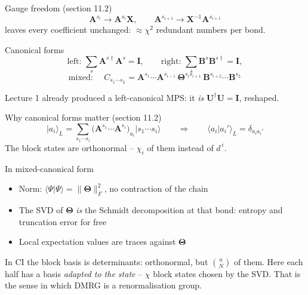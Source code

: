 \documentclass[aspectratio=169,10pt]{beamer}
\newcommand{\mbbox}[1]{%
  \begin{tcolorbox}[colback=paleblue,colframe=uioblue,title={\bfseries Many-body connection}]
  #1
  \end{tcolorbox}}
\newcommand{\ket}[1]{\vert #1\rangle}
\newcommand{\braket}[2]{\langle #1\vert #2\rangle}
\newcommand{\bmat}[1]{\bm{#1}}
\newcommand{\Amat}[1]{\bm{A}^{#1}}
\newcommand{\Bmat}[1]{\bm{B}^{#1}}
\begin{document}
\begin{frame}{Gauge freedom (section 11.2)}
  \[
    \Amat{s_i}\to\Amat{s_i}\bmat X,\qquad \Amat{s_{i+1}}\to\bmat X^{-1}\Amat{s_{i+1}}
  \]
  leaves every coefficient unchanged: $\approx\chi^2$ redundant numbers per bond.
  \begin{center}
  \end{center}
  \begin{block}{Canonical forms}
    \[
      \text{left: }\sum_s\Amat{s\dagger}\Amat s=\bmat I,
      \qquad
      \text{right: }\sum_s\Bmat{s}\Bmat{s\dagger}=\bmat I,
    \]
    \[
      \text{mixed: }\quad C_{s_1\cdots s_L}=\Amat{s_1}\cdots\Amat{s_{i-1}}\,\bm\Theta^{s_is_{i+1}}\,\Bmat{s_{i+2}}\cdots\Bmat{s_L}
    \]
  \end{block}
  \centering\small Lecture 1 already produced a left-canonical MPS: it \emph{is} $\bmat U^{\dagger}\bmat U=\bmat I$, reshaped.
\end{frame}

\begin{frame}{Why canonical forms matter (section 11.2)}
  \[
    \ket{a_i}_L=\sum_{s_1\cdots s_i}\bigl(\Amat{s_1}\cdots\Amat{s_i}\bigr)_{a_i}\ket{s_1\cdots s_i}
    \qquad\Longrightarrow\qquad
    \braket{a_i}{a_i'}_L=\delta_{a_ia_i'}
  \]
  \centering\alert{The block states are orthonormal} -- $\chi_i$ of them instead of $d^{\,i}$.
  \begin{block}{In mixed-canonical form}
    \begin{itemize}
      \item Norm: $\braket\Psi\Psi=\|\bm\Theta\|_F^2$, no contraction of the chain
      \item The SVD of $\bm\Theta$ \emph{is} the Schmidt decomposition at that bond: entropy and truncation error \alert{for free}
      \item Local expectation values are traces against $\bm\Theta$
    \end{itemize}
  \end{block}
  \mbbox{In CI the block basis is determinants: orthonormal, but $\binom nN$ of them. Here each half has a basis \emph{adapted to the state} -- $\chi$ block states chosen by the SVD. That is the sense in which DMRG is a renormalisation group.}
\end{frame}
\end{document}
